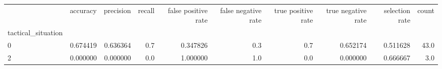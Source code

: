 \begin{tabular}{lrrrrrrrrr}
\toprule
{} &  accuracy &  precision &  recall &  false positive rate &  false negative rate &  true positive rate &  true negative rate &  selection rate &  count \\
tactical\_situation &           &            &         &                      &                      &                     &                     &                 &        \\
\midrule
0                  &  0.674419 &   0.636364 &     0.7 &             0.347826 &                  0.3 &                 0.7 &            0.652174 &        0.511628 &   43.0 \\
2                  &  0.000000 &   0.000000 &     0.0 &             1.000000 &                  1.0 &                 0.0 &            0.000000 &        0.666667 &    3.0 \\
\bottomrule
\end{tabular}
